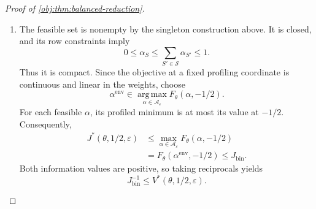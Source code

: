 \documentclass[11pt]{article}
\begin{document}
\begin{proof}[Proof of \cref{obj:thm:balanced-reduction}]
\begin{enumerate}
We now identify this information with the staircase objective. Balance
gives
\[
\tau=1-2\mu_0,
\qquad
\pi_\theta
=\frac12(1-\mu_0,\mu_0,\mu_0,1-\mu_0)^\top.
\]
Hence, for every \(S\in\mathcal S\),
\[
\begin{aligned}
h_S(\theta)
&=\frac{(1-\mu_0)\{b_S(0)+b_S(3)\}
+\mu_0\{b_S(1)+b_S(2)\}}2,\\
g_S^\top v(-1/2)
&=\frac{b_S(0)+b_S(3)-b_S(1)-b_S(2)}4.
\end{aligned}
\]
Define the grouped atomic probabilities by
\[
q_{\alpha,+}(S)
:=\frac{\alpha_S\{b_S(0)+b_S(3)\}}2,
\qquad
q_{\alpha,-}(S)
:=\frac{\alpha_S\{b_S(1)+b_S(2)\}}2.
\]
The discrete Fisher-information formula therefore gives
\[
\begin{aligned}
\mathcal I_\alpha
&=
\sum_{S\in\mathcal S}
\frac{\bigl\{(q_{\alpha,+}(S)-q_{\alpha,-}(S))/2\bigr\}^2}
{\{(1+\tau)q_{\alpha,+}(S)
+(1-\tau)q_{\alpha,-}(S)\}/2}\\
&=
\sum_{S\in\mathcal S}
\alpha_S\frac{(g_S^\top v(-1/2))^2}{h_S(\theta)}
=F_\theta(\alpha,-1/2).
\end{aligned}
\]
Here a summand with \(\alpha_S=0\) is defined as zero; both grouped
probabilities then vanish. When \(\alpha_S>0\), its mixture probability
is \(\alpha_Sh_S(\theta)>0\), and the displayed equality follows by
cancellation. We have proved
\[
F_\theta(\alpha,-1/2)\le J_{\mathrm{bin}}
\qquad\text{for every }\alpha\in\mathcal A_\varepsilon.
\]

\item The feasible set is nonempty by the singleton construction above.
It is closed, and its row constraints imply
\[
0\le\alpha_S\le\sum_{S'\in\mathcal S}\alpha_{S'}\le1.
\]
Thus it is compact. Since the objective at a fixed profiling coordinate
is continuous and linear in the weights, choose
\[
\alpha^{\mathrm{env}}
\in\operatorname*{arg\,max}_{\alpha\in\mathcal A_\varepsilon}
F_\theta(\alpha,-1/2).
\]
For each feasible \(\alpha\), its profiled minimum is at most its value
at \(-1/2\). Consequently,
\[
\begin{aligned}
J^*(\theta,1/2,\varepsilon)
&\le
\max_{\alpha\in\mathcal A_\varepsilon}
F_\theta(\alpha,-1/2)\\
&=F_\theta(\alpha^{\mathrm{env}},-1/2)
\le J_{\mathrm{bin}}.
\end{aligned}
\]
Both information values are positive, so taking reciprocals yields
\[
J_{\mathrm{bin}}^{-1}
\le V^*(\theta,1/2,\varepsilon).
\]


\end{enumerate}
\end{proof}
\end{document}
